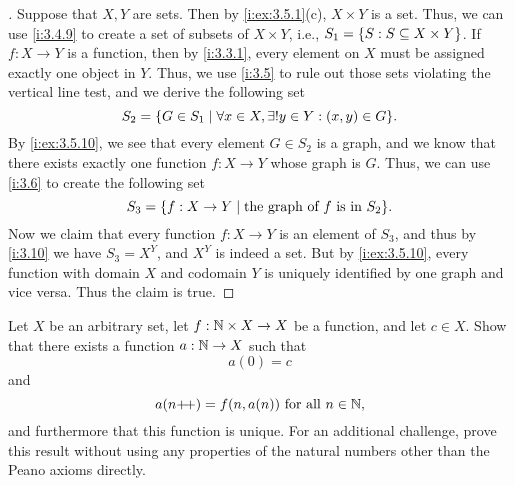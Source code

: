 \begin{proof}[]
  Suppose that \(X, Y\) are sets.
  Then by \cref{i:ex:3.5.1}(c), \(X \times Y\) is a set.
  Thus, we can use \cref{i:3.4.9} to create a set of subsets of \(X \times Y\), i.e., \(S_1 = \left\lbrace S : S \subseteq X \times Y\right\rbrace\).
  If \(f : X \to Y\) is a function, then by \cref{i:3.3.1}, every element on \(X\) must be assigned exactly one object in \(Y\).
  Thus, we use \cref{i:3.5} to rule out those sets violating the vertical line test, and we derive the following set
  \[
    S_2 = \set{G \in S_1 \mid \forall x \in X, \exists! y \in Y : (x, y) \in G}.
  \]
  By \cref{i:ex:3.5.10}, we see that every element \(G \in S_2\) is a graph, and we know that there exists exactly one function \(f : X \to Y\) whose graph is \(G\).
  Thus, we can use \cref{i:3.6} to create the following set
  \[
    S_3 = \set{f : X \to Y \mid \text{the graph of } f \text{ is in } S_2}.
  \]
  Now we claim that every function \(f : X \to Y\) is an element of \(S_3\), and thus by \cref{i:3.10} we have \(S_3 = X^Y\), and \(X^Y\) is indeed a set.
  But by \cref{i:ex:3.5.10}, every function with domain \(X\) and codomain \(Y\) is uniquely identified by one graph and vice versa.
  Thus the claim is true.
\end{proof}

\begin{ex}\label{i:ex:3.5.12}
  Let \(X\) be an arbitrary set, let \(f : \mathbb{N} \times X \to X\) be a function, and let \(c \in X\).
  Show that there exists a function \(a : \mathbb{N} \to X\) such that
  \[
    a(0) = c
  \]
  and
  \[
    a(n{+}\!{+}) = f(n, a(n)) \text{ for all } n \in \mathbb{N},
  \]
  and furthermore that this function is unique.
  For an additional challenge, prove this result without using any properties of the natural numbers other than the Peano axioms directly.
\end{ex}

